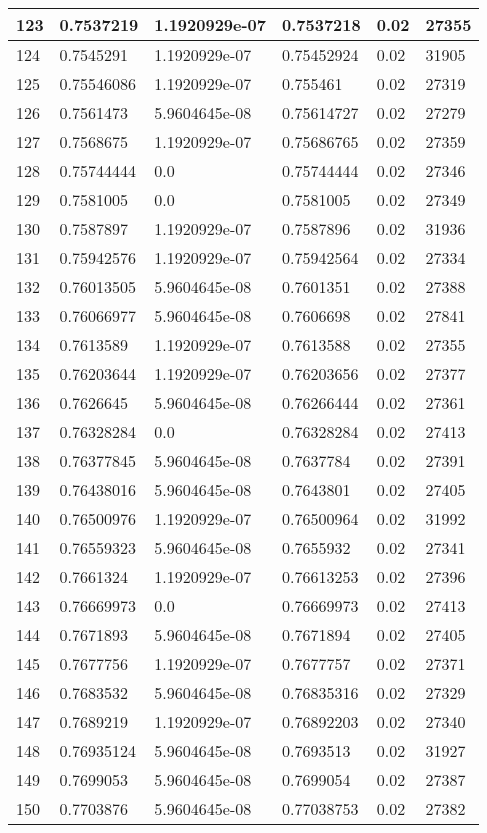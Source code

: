 \begin{longtable}{|l|l|l|l|l|l|}
123 & 0.7537219 & 1.1920929e-07 & 0.7537218 & 0.02 & 27355 \\ \hline 
124 & 0.7545291 & 1.1920929e-07 & 0.75452924 & 0.02 & 31905 \\ \hline 
125 & 0.75546086 & 1.1920929e-07 & 0.755461 & 0.02 & 27319 \\ \hline 
126 & 0.7561473 & 5.9604645e-08 & 0.75614727 & 0.02 & 27279 \\ \hline 
127 & 0.7568675 & 1.1920929e-07 & 0.75686765 & 0.02 & 27359 \\ \hline 
128 & 0.75744444 & 0.0 & 0.75744444 & 0.02 & 27346 \\ \hline 
129 & 0.7581005 & 0.0 & 0.7581005 & 0.02 & 27349 \\ \hline 
130 & 0.7587897 & 1.1920929e-07 & 0.7587896 & 0.02 & 31936 \\ \hline 
131 & 0.75942576 & 1.1920929e-07 & 0.75942564 & 0.02 & 27334 \\ \hline 
132 & 0.76013505 & 5.9604645e-08 & 0.7601351 & 0.02 & 27388 \\ \hline 
133 & 0.76066977 & 5.9604645e-08 & 0.7606698 & 0.02 & 27841 \\ \hline 
134 & 0.7613589 & 1.1920929e-07 & 0.7613588 & 0.02 & 27355 \\ \hline 
135 & 0.76203644 & 1.1920929e-07 & 0.76203656 & 0.02 & 27377 \\ \hline 
136 & 0.7626645 & 5.9604645e-08 & 0.76266444 & 0.02 & 27361 \\ \hline 
137 & 0.76328284 & 0.0 & 0.76328284 & 0.02 & 27413 \\ \hline 
138 & 0.76377845 & 5.9604645e-08 & 0.7637784 & 0.02 & 27391 \\ \hline 
139 & 0.76438016 & 5.9604645e-08 & 0.7643801 & 0.02 & 27405 \\ \hline 
140 & 0.76500976 & 1.1920929e-07 & 0.76500964 & 0.02 & 31992 \\ \hline 
141 & 0.76559323 & 5.9604645e-08 & 0.7655932 & 0.02 & 27341 \\ \hline 
142 & 0.7661324 & 1.1920929e-07 & 0.76613253 & 0.02 & 27396 \\ \hline 
143 & 0.76669973 & 0.0 & 0.76669973 & 0.02 & 27413 \\ \hline 
144 & 0.7671893 & 5.9604645e-08 & 0.7671894 & 0.02 & 27405 \\ \hline 
145 & 0.7677756 & 1.1920929e-07 & 0.7677757 & 0.02 & 27371 \\ \hline 
146 & 0.7683532 & 5.9604645e-08 & 0.76835316 & 0.02 & 27329 \\ \hline 
147 & 0.7689219 & 1.1920929e-07 & 0.76892203 & 0.02 & 27340 \\ \hline 
148 & 0.76935124 & 5.9604645e-08 & 0.7693513 & 0.02 & 31927 \\ \hline 
149 & 0.7699053 & 5.9604645e-08 & 0.7699054 & 0.02 & 27387 \\ \hline 
150 & 0.7703876 & 5.9604645e-08 & 0.77038753 & 0.02 & 27382 \\ \hline 
\end{longtable}